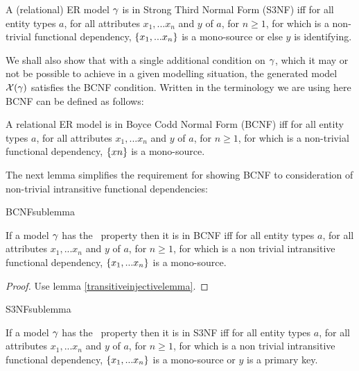 \begin{definition} %
A (relational) ER model $\gamma$ is in Strong Third Normal Form (S3NF)  iff
for all entity types $a$, for all attributes $x_1,...x_n$ and $y$ of $a$, for $n \geq 1$, 
for which   is a non-trivial functional dependency, 
$\left\{x_1,...x_n\right\}$ is a mono-source or else $y$ is identifying.
\end{definition}

We shall also show that with a single additional condition on $\gamma$, which it may or not be possible to achieve in a given modelling situation,
the generated model $\mathcal{X}(\gamma)$ satisfies the BCNF condition.
Written in the terminology we are using here BCNF can be defined as follows:
\begin{definition} %
A relational ER model is in Boyce Codd Normal Form (BCNF)  iff
for all entity types $a$, for all attributes $x_1,...x_n$ and $y$ of $a$, for $n \geq 1$, 
for which   is a non-trivial functional dependency, 
$\left\{xn\right\}$ is a mono-source.  
\end{definition}

\noindent The next lemma simplifies the requirement for showing BCNF to consideration of non-trivial
intransitive functional dependencies:

BCNFsublemma
\begin{lemma}
\label{BCNFsublemma}
If a model $\gamma$ has the \fdfactoring\ property then it is in BCNF iff
for all entity types $a$, for all attributes $x_1,...x_n$ and $y$ of $a$, for $n \geq 1$, 
for which  is a non trivial  intransitive functional dependency,
$\left\{x_1,...x_n\right\}$ is a mono-source. 
\end{lemma}
\begin{proof}Use lemma \ref{transitiveinjectivelemma}.
\end{proof}
S3NFsublemma
\begin{lemma}
\label{S3NFsublemma}
If a model $\gamma$ has the \fdfactoring\ property then it is in S3NF iff
for all entity types $a$, for all attributes $x_1,...x_n$ and $y$ of $a$, for $n \geq 1$, 
for which  is a non trivial intransitive functional dependency,
$\left\{x_1,...x_n\right\}$ is a mono-source or $y$ is a primary key. 
\end{lemma}

